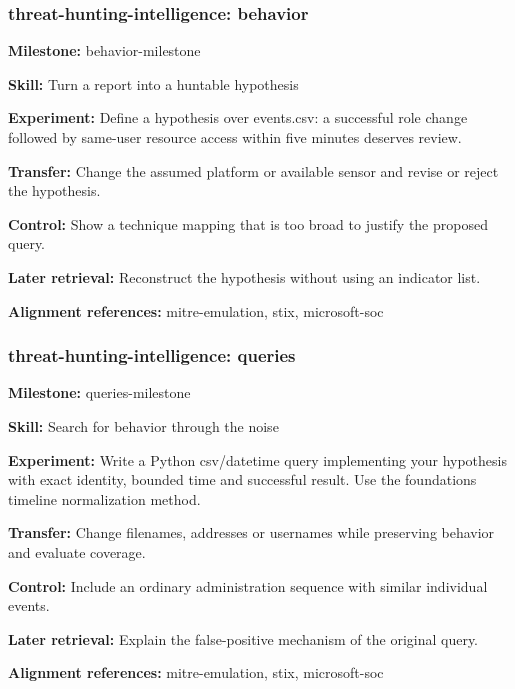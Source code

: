 \subsubsection{threat-hunting-intelligence: behavior}
\noindent\textbf{Milestone:} behavior-milestone\par
\noindent\textbf{Skill:} Turn a report into a huntable hypothesis\par
\noindent\textbf{Experiment:} Define a hypothesis over events.csv: a successful role change followed by same-user resource access within five minutes deserves review.\par
\noindent\textbf{Transfer:} Change the assumed platform or available sensor and revise or reject the hypothesis.\par
\noindent\textbf{Control:} Show a technique mapping that is too broad to justify the proposed query.\par
\noindent\textbf{Later retrieval:} Reconstruct the hypothesis without using an indicator list.\par
\noindent\textbf{Alignment references:} mitre-emulation, stix, microsoft-soc\par
\subsubsection{threat-hunting-intelligence: queries}
\noindent\textbf{Milestone:} queries-milestone\par
\noindent\textbf{Skill:} Search for behavior through the noise\par
\noindent\textbf{Experiment:} Write a Python csv/datetime query implementing your hypothesis with exact identity, bounded time and successful result. Use the foundations timeline normalization method.\par
\noindent\textbf{Transfer:} Change filenames, addresses or usernames while preserving behavior and evaluate coverage.\par
\noindent\textbf{Control:} Include an ordinary administration sequence with similar individual events.\par
\noindent\textbf{Later retrieval:} Explain the false-positive mechanism of the original query.\par
\noindent\textbf{Alignment references:} mitre-emulation, stix, microsoft-soc\par
